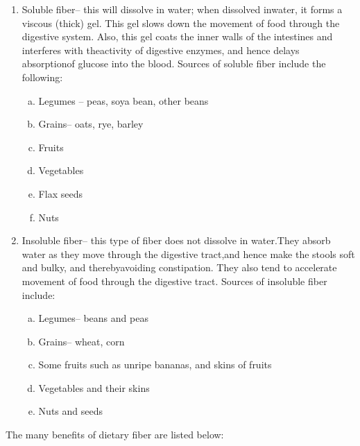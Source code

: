 \vspace{-\topsep}
\begin{enumerate}
\itemsep=0pt
\item Soluble fiber– this will dissolve in water; when dissolved in\break water, it forms a viscous (thick) gel. This gel slows down the movement of food through the digestive system. Also, this gel coats the inner walls of the intestines and interferes with the\break activity of digestive enzymes, and hence delays absorption\break of glucose into the blood. Sources of soluble fiber include the following:
\vspace{-\topsep}
\begin{enumerate}[a)]
\itemsep=0pt
\item Legumes – peas, soya bean, other beans
\item Grains– oats, rye, barley
\item Fruits
\item Vegetables
\item Flax seeds
\item Nuts
\end{enumerate}
\vspace{-\topsep}
\item Insoluble fiber– this type of fiber does not dissolve in water.\break They absorb water as they move through the digestive tract,\break and hence make the stools soft and bulky, and thereby\break avoiding constipation. They also tend to accelerate movement of food through the digestive tract. Sources of insoluble fiber include:
\vspace{-\topsep}
\begin{enumerate}[a)]
\itemsep=0pt
\item Legumes– beans and peas
\item Grains– wheat, corn
\item Some fruits such as unripe bananas, and skins of fruits
\item Vegetables and their skins
\item Nuts and seeds
\end{enumerate}
\end{enumerate}
\vspace{-\topsep}

\noindent The many benefits of dietary fiber are listed below:

